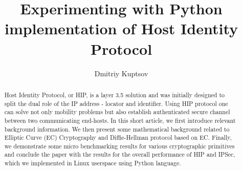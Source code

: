 \documentclass[conference,10pt,letter]{IEEEtran}
\begin{document}
\sloppy
\title{Experimenting with Python implementation of Host Identity Protocol}
\author{Dmitriy Kuptsov}
\maketitle
\begin{abstract}
Host Identity Protocol, or HIP, is a layer 3.5 solution and 
was initially designed to split the dual role of the IP 
address - locator and identifier. Using HIP protocol one 
can solve not only mobility problems but also establish 
authenticated secure channel between two communicating 
end-hosts. In this short article, we first introduce relevant 
background information. We then present some mathematical 
background related to Elliptic Curve (EC) Cryptography and 
Diffie-Hellman protocol based on EC. Finally, we demonstrate 
some micro benchmarking results for various cryptographic 
primitives and conclude the paper with the results for the 
overall performance of HIP and IPSec, which we implemented 
in Linux userspace using Python language.
\end{abstract}







\end{document}
